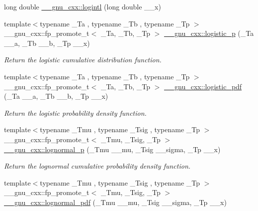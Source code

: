 \begin{DoxyCompactItemize}
long double \hyperlink{group__gnu__math__spec__func_gab17f5cadc8f77ba2666d0d5ecc78de5d}{\+\_\+\+\_\+gnu\+\_\+cxx\+::logintl} (long double \+\_\+\+\_\+x)
\item 
{\footnotesize template$<$typename \+\_\+\+Ta , typename \+\_\+\+Tb , typename \+\_\+\+Tp $>$ }\\\+\_\+\+\_\+gnu\+\_\+cxx\+::fp\+\_\+promote\+\_\+t$<$ \+\_\+\+Ta, \+\_\+\+Tb, \+\_\+\+Tp $>$ \hyperlink{group__gnu__math__spec__func_ga5a5d9c5e7ab822f84578415be8609f49}{\+\_\+\+\_\+gnu\+\_\+cxx\+::logistic\+\_\+p} (\+\_\+\+Ta \+\_\+\+\_\+a, \+\_\+\+Tb \+\_\+\+\_\+b, \+\_\+\+Tp \+\_\+\+\_\+x)
\begin{DoxyCompactList}\small\item\em Return the logistic cumulative distribution function. \end{DoxyCompactList}\item 
{\footnotesize template$<$typename \+\_\+\+Ta , typename \+\_\+\+Tb , typename \+\_\+\+Tp $>$ }\\\+\_\+\+\_\+gnu\+\_\+cxx\+::fp\+\_\+promote\+\_\+t$<$ \+\_\+\+Ta, \+\_\+\+Tb, \+\_\+\+Tp $>$ \hyperlink{group__gnu__math__spec__func_gaeb3e768c11c8cd11804827a09f19b1e3}{\+\_\+\+\_\+gnu\+\_\+cxx\+::logistic\+\_\+pdf} (\+\_\+\+Ta \+\_\+\+\_\+a, \+\_\+\+Tb \+\_\+\+\_\+b, \+\_\+\+Tp \+\_\+\+\_\+x)
\begin{DoxyCompactList}\small\item\em Return the logistic probability density function. \end{DoxyCompactList}\item 
{\footnotesize template$<$typename \+\_\+\+Tmu , typename \+\_\+\+Tsig , typename \+\_\+\+Tp $>$ }\\\+\_\+\+\_\+gnu\+\_\+cxx\+::fp\+\_\+promote\+\_\+t$<$ \+\_\+\+Tmu, \+\_\+\+Tsig, \+\_\+\+Tp $>$ \hyperlink{group__gnu__math__spec__func_ga3bbd4feb10f2d745bf8aca8748099c53}{\+\_\+\+\_\+gnu\+\_\+cxx\+::lognormal\+\_\+p} (\+\_\+\+Tmu \+\_\+\+\_\+mu, \+\_\+\+Tsig \+\_\+\+\_\+sigma, \+\_\+\+Tp \+\_\+\+\_\+x)
\begin{DoxyCompactList}\small\item\em Return the lognormal cumulative probability density function. \end{DoxyCompactList}\item 
{\footnotesize template$<$typename \+\_\+\+Tmu , typename \+\_\+\+Tsig , typename \+\_\+\+Tp $>$ }\\\+\_\+\+\_\+gnu\+\_\+cxx\+::fp\+\_\+promote\+\_\+t$<$ \+\_\+\+Tmu, \+\_\+\+Tsig, \+\_\+\+Tp $>$ \hyperlink{group__gnu__math__spec__func_gaef4db41e58e53144df2ddcc834d88e0b}{\+\_\+\+\_\+gnu\+\_\+cxx\+::lognormal\+\_\+pdf} (\+\_\+\+Tmu \+\_\+\+\_\+mu, \+\_\+\+Tsig \+\_\+\+\_\+sigma, \+\_\+\+Tp \+\_\+\+\_\+x)

\end{DoxyCompactItemize}
